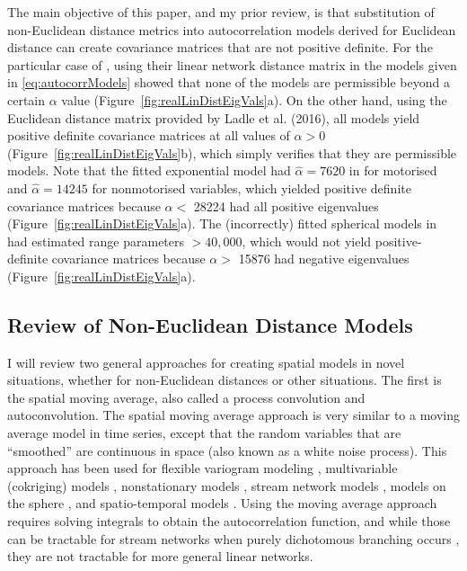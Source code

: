 \documentclass[11pt, titlepage]{article}\usepackage[]{graphicx}\usepackage[]{color}
\begin{document}
\begin{spacing}{1.9}
\begin{flushleft}
The main objective of this paper, and my prior review, is that substitution of non-Euclidean distance metrics into autocorrelation models derived for Euclidean distance can create covariance matrices that are not positive definite. For the particular case of \citet{Ladl:Avga:Whea:Boyc:pred:2016}, using their linear network distance matrix in the models given in \ref{eq:autocorrModels} showed that none of the models are permissible beyond a certain $\alpha$ value (Figure~\ref{fig:realLinDistEigVals}a).  On the other hand, using the Euclidean distance matrix provided by Ladle et al. (2016), all models yield positive definite covariance matrices at all values of $\alpha > 0$ (Figure~\ref{fig:realLinDistEigVals}b), which simply verifies that they are permissible models.  Note that the fitted exponential model had $\hat{\alpha} = 7620$ in \citet{Ladl:Avga:Whea:Boyc:pred:2016} for motorised and $\hat{\alpha} = 14245$ for nonmotorised variables, which yielded positive definite covariance matrices because $\alpha <$ 28224 had all positive eigenvalues (Figure~\ref{fig:realLinDistEigVals}a). The (incorrectly) fitted spherical models in \citet{Ladl:Avga:Whea:Boyc:pred:2016} had estimated range parameters $>40,000$, which would not yield positive-definite covariance matrices because $\alpha >$ 15876 had negative eigenvalues (Figure~\ref{fig:realLinDistEigVals}a).

\subsection*{Review of Non-Euclidean Distance Models}

I will review two general approaches for creating spatial models in novel situations, whether for non-Euclidean distances or other situations.  The first is the spatial moving average, also called a process convolution and autoconvolution.  The spatial moving average approach is very similar to a moving average model in time series, except that the random variables that are ``smoothed'' are continuous in space (also known as a white noise process).  This approach has been used for flexible variogram modeling \citep{Barr:Ver:blac:1996}, multivariable (cokriging) models \citep{Ver:Barr:cons:1998,Ver:Cres:Barr:flex:2004}, nonstationary models \citep{Higd:proc:1998,Higd:Swal:Kern:non-:1999}, stream network models \citep{Ver:Pete:Theo:spat:2006, Cres:Frey:Harc:Smit:spat:2006, Ver:Pete:Move:2010}, models on the sphere \citep{Gnei:stri:2013}, and spatio-temporal models \citep{Wikl:kern:2002}. Using the moving average approach requires solving integrals to obtain the autocorrelation function, and while those can be tractable for stream networks when purely dichotomous branching occurs \citep{Ver:Pete:Theo:spat:2006}, they are not tractable for more general linear networks. 


\end{flushleft}
\end{spacing}
\end{document}
